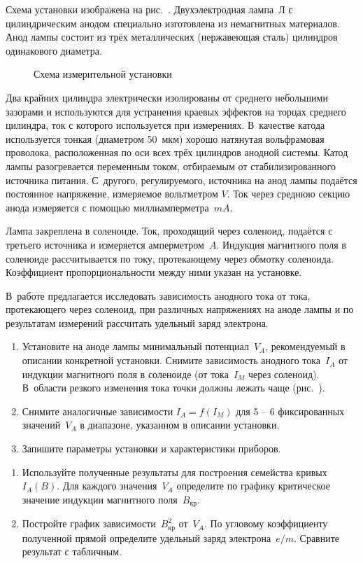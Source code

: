 \experiment Схема установки изображена на рис.~. Двухэлектродная
лампа~$\text{Л}$ с цилиндрическим анодом специально изготовлена из немагнитных
материалов. Анод лампы состоит из трёх металлических (нержавеющая сталь)
цилиндров одинакового диаметра.
\begin{figure}[h!]
	\caption{Схема измерительной установки}
\end{figure}
Два крайних цилиндра электрически изолированы от среднего небольшими зазорами и
используются для устранения краевых эффектов на торцах среднего цилиндра, ток с
которого используется при измерениях. В~качестве катода используется тонкая
(диаметром 50~мкм) хорошо натянутая вольфрамовая проволока, расположенная по оси
всех трёх цилиндров анодной системы. Катод лампы разогревается переменным током,
отбираемым от стабилизированного источника питания. С~другого,  регулируемого,
источника на анод лампы подаётся постоянное напряжение, измеряемое вольтметром
$V$. Ток через среднюю секцию анода измеряется с помощью миллиамперметра~$mA$.

Лампа закреплена в соленоиде. Ток, проходящий через соленоид, подаётся с
третьего источника и измеряется амперметром~$A$. Индукция магнитного поля в
соленоиде рассчитывается по току, протекающему через обмотку соленоида.
Коэффициент пропорциональности между ними указан на установке.

\begin{lab:task}

В~работе предлагается исследовать зависимость анодного тока от тока,
протекающего через соленоид, при различных
напряжениях на аноде лампы и по результатам измерений рассчитать удельный заряд
электрона.

\begin{enumerate}
\item{ Установите на аноде лампы минимальный потенциал~$V_A$, рекомендуемый в
описании конкретной установки. Снимите зависимость анодного тока~$I_A$ от
индукции магнитного поля в соленоиде (от тока~$I_{M}$ через соленоид). В~области
резкого изменения тока точки должны лежать чаще (рис.~)}.
\item{ Снимите аналогичные зависимости $I_A=f(I_M)$ для 5 -- 6 фиксированных
значений~$V_A$ в диапазоне, указанном в описании установки.}

\item{ Запишите параметры установки и характеристики приборов.}
\end{enumerate}

\begin{enumerate}
\item{Используйте полученные результаты для построения семейства кривых
$I_{A}(B)$. Для каждого значения~$V_A$ определите по графику критическое
значение индукции магнитного поля~$B_\text{кр}$}.
\item Постройте  график зависимости~$B_\text{кр}^2$ от~$V_A$. По угловому
коэффициенту полученной прямой определите удельный заряд электрона~$e/m$.
Сравните результат с табличным.
\end{enumerate}
\end{lab:task}

